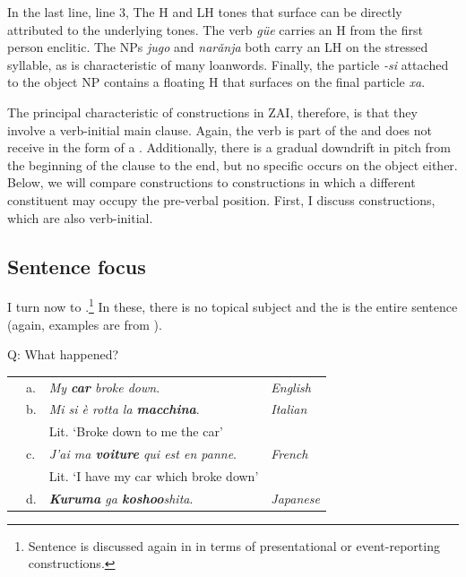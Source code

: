 In the last line, line 3, The H and LH tones that surface can be directly attributed to the underlying tones. The verb \textit{g\"{u}e} carries an H  from the first person enclitic. The NPs \textit{jugo} and  \textit{nar\v{a}nja} both carry an LH  on the stressed syllable, as is characteristic of many  loanwords. Finally, the particle \textit{-si} attached to the object NP contains a floating H  that surfaces on the final particle \textit{xa}. 

The principal characteristic of  constructions in ZAI, therefore, is that they involve a verb-initial main clause. Again, the verb is part of the  and does not receive  in the form of a . Additionally, there is a gradual downdrift in pitch from the beginning of the clause to the end, but no specific  occurs on the object either. Below, we will compare  constructions to  constructions in which a different constituent may occupy the pre-verbal position. First, I discuss  constructions, which are also verb-initial.



\subsection{Sentence focus}\label{sfsection}

I turn now to .\footnote{Sentence  is discussed again in  in terms of presentational or event-reporting constructions.} In these, there is no topical subject and the  is the entire sentence (again, examples are from \citealt{lambrecht1994}). 


\ea\label{SF}
{Q: What happened?} \\
\begin{table} 
\begin{tabular}{l l l l}
 & a. & \textit{My \textbf{car} broke down}. & \textit{English} \\
 & b. & \textit{Mi si \`{e} rotta la \textbf{macchina}}. & \textit{Italian}  \\
  & & Lit. `Broke down to me the car'  \\
 & c. & \textit{J'ai ma \textbf{voiture} qui est en panne}. & \textit{French}  \\
  & & Lit. `I have my car which broke down' \\
   & d. & \textit{\textbf{Kuruma} ga \textbf{koshoo}shita}. & \textit{Japanese}  \\
\end{tabular}
\end{table}
\z

